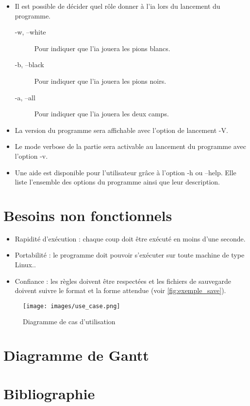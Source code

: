 \documentclass[10pt,a4paper]{article}
\begin{document}
\begin {itemize}
\begin{figure}[H]
\begin{BVerbatim}
    \end{BVerbatim}
    \caption {Exemple de grille générée avec l'option \textsc{-s2}.\label{fig:exemple_taille}}
  \end{figure}
\item  Il est possible de décider quel rôle donner à l'ia lors du lancement du programme.
  \begin{description}
  \item [-w, --white] Pour indiquer que l'ia jouera les pions blancs.
  \item [-b, --black] Pour indiquer que l'ia jouera les pions noirs.
  \item [-a, --all] Pour indiquer que l'ia jouera les deux camps.
  \end{description}
\item  La version du programme sera affichable avec l'option de lancement -V. 
\item  Le mode verbose de la partie sera activable au lancement du programme avec l'option -v. %
\item  Une aide est disponible pour l'utilisateur grâce à l'option -h ou --help. Elle liste l'ensemble des options du programme ainsi que leur description.
\end{itemize}

\newpage
\section{Besoins non fonctionnels}

\begin{itemize} 
\item Rapidité d'exécution : chaque coup doit être exécuté en moins d'une seconde.
\item Portabilité : le programme doit pouvoir s'exécuter sur toute machine de type Linux..
\item Confiance : les règles doivent être respectées et les fichiers de sauvegarde doivent suivre le format et la forme attendue (voir \ref{fig:exemple_save}).
\end{itemize}

\begin{figure}[H]
\centering
\texttt{[image: images/use\_case.png]}
\label{use_case}
\caption{Diagramme de cas d'utilisation}
\end{figure}

\section{Diagramme de Gantt}

\section{Bibliographie}
\end{document}
